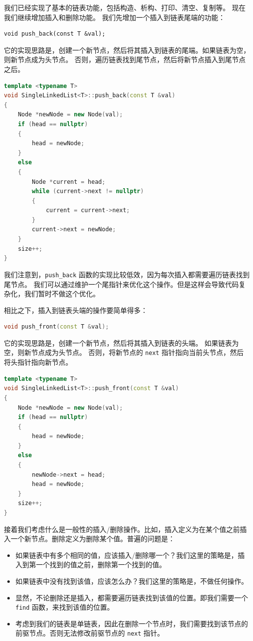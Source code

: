 \documentclass[a4paper]{ctexart}
\theoremstyle{definition}
\theoremstyle{definition}
\begin{document}
我们已经实现了基本的链表功能，包括构造、析构、打印、清空、复制等。 现在我们继续增加插入和删除功能。
我们先增加一个插入到链表尾端的功能：
\begin{lstlisting}
void push_back(const T &val);  
\end{lstlisting}
它的实现思路是，创建一个新节点，然后将其插入到链表的尾端。如果链表为空，则新节点成为头节点。 否则，遍历链表找到尾节点，然后将新节点插入到尾节点之后。
\begin{lstlisting}[language=c++]
template <typename T>
void SingleLinkedList<T>::push_back(const T &val)
{
    Node *newNode = new Node(val);
    if (head == nullptr)
    {
        head = newNode;
    }
    else
    {
        Node *current = head;
        while (current->next != nullptr)
        {
            current = current->next;
        }
        current->next = newNode;
    }
    size++;
}
\end{lstlisting}
我们注意到，\verb|push_back| 函数的实现比较低效，因为每次插入都需要遍历链表找到尾节点。
我们可以通过维护一个尾指针来优化这个操作。但是这样会导致代码复杂化，我们暂时不做这个优化。

相比之下，插入到链表头端的操作要简单得多：
\begin{lstlisting}[language=c++]
void push_front(const T &val);
\end{lstlisting}
它的实现思路是，创建一个新节点，然后将其插入到链表的头端。 如果链表为空，则新节点成为头节点。 否则，将新节点的 \verb|next| 指针指向当前头节点，然后将头指针指向新节点。
\begin{lstlisting}[language=c++]
template <typename T>
void SingleLinkedList<T>::push_front(const T &val)
{
    Node *newNode = new Node(val);
    if (head == nullptr)
    {
        head = newNode;
    }
    else
    {
        newNode->next = head;
        head = newNode;
    }
    size++;
}
\end{lstlisting}

接着我们考虑什么是一般性的插入/删除操作。比如，插入定义为在某个值之前插入一个新节点。删除定义为删除某个值。普遍的问题是：
\begin{itemize}
  \item 如果链表中有多个相同的值，应该插入/删除哪一个？我们这里的策略是，插入到第一个找到的值之前，删除第一个找到的值。
  \item 如果链表中没有找到该值，应该怎么办？我们这里的策略是，不做任何操作。
  \item 显然，不论删除还是插入，都需要遍历链表找到该值的位置。即我们需要一个 \verb|find| 函数，来找到该值的位置。
  \item 考虑到我们的链表是单链表，因此在删除一个节点时，我们需要找到该节点的前驱节点。否则无法修改前驱节点的 \verb|next| 指针。
\end{itemize}
\end{document}
